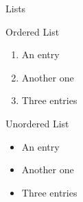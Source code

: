 \documentclass[a4paper, 12pt]{article}
\begin{document}
Lists

Ordered List
\begin{enumerate}
    \item An entry
    \item Another one
    \item Three entries
\end{enumerate}

Unordered List
\begin{itemize}
    \item An entry
    \item Another one
    \item Three entries
\end{itemize}
\end{document}
